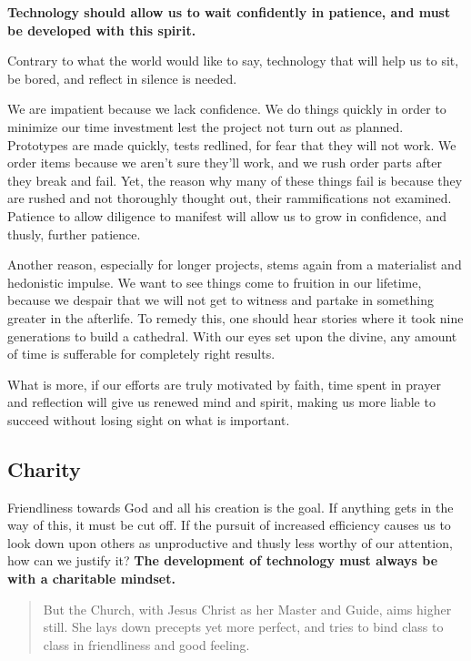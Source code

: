 \documentclass[letterpaper]{article}
\begin{document}
\textbf{Technology should allow us to wait confidently in patience, and must be developed with this spirit.}

Contrary to what the world would like to say, technology that will help us to sit, be bored, and reflect in silence is needed.

We are impatient because we lack confidence. We do things quickly in order to minimize our time investment lest the project not turn out as planned. Prototypes are made quickly, tests redlined, for fear that they will not work. We order items because we aren't sure they'll work, and we rush order parts after they break and fail. Yet, the reason why many of these things fail is because they are rushed and not thoroughly thought out, their rammifications not examined. Patience to allow diligence to manifest will allow us to grow in confidence, and thusly, further patience.

Another reason, especially for longer projects, stems again from a materialist and hedonistic impulse. We want to see things come to fruition in our lifetime, because we despair that we will not get to witness and partake in something greater in the afterlife. To remedy this, one should hear stories where it took nine generations to build a cathedral. With our eyes set upon the divine, any amount of time is sufferable for completely right results.

What is more, if our efforts are truly motivated by faith, time spent in prayer and reflection will give us renewed mind and spirit, making us more liable to succeed without losing sight on what is important.

\subsection{Charity}


Friendliness towards God and all his creation is the goal. If anything gets in the way of this, it must be cut off. If the pursuit of increased efficiency causes us to look down upon others as unproductive and thusly less worthy of our attention, how can we justify it? \textbf{The development of technology must always be with a charitable mindset.}

\begin{quote}
  But the Church, with Jesus Christ as her Master and Guide, aims higher still. She lays down precepts yet more perfect, and tries to bind class to class in friendliness and good feeling.
\end{quote}
\end{document}
